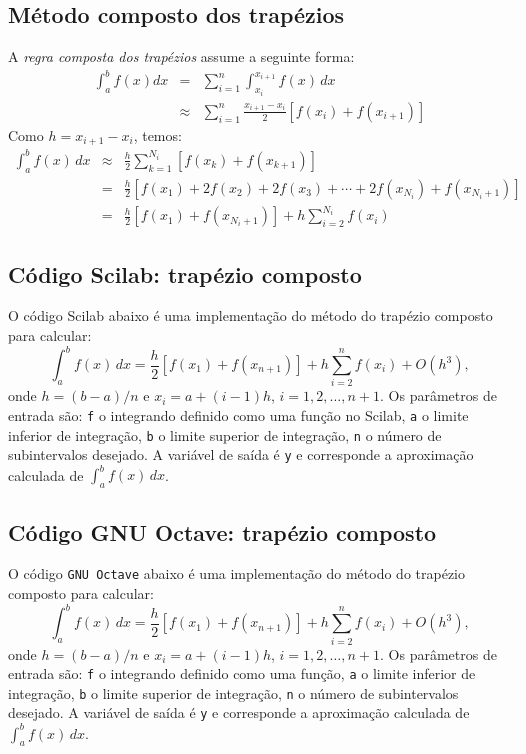 \subsection{Método composto dos trapézios}
A \emph{regra composta dos trapézios} assume a seguinte forma:
\begin{eqnarray*}
  \int_{a}^b f(x)dx &=& \sum_{i=1}^{n} \int_{x_i}^{x_{i+1}}f(x)\,dx \\
  &\approx& \sum_{i=1}^{n} \frac{x_{i+1}-x_i}{2}\left[f(x_i)+f(x_{i+1})\right]
\end{eqnarray*}
Como $h = x_{i+1} - x_i$, temos:
\begin{eqnarray*}
\int_{a}^b f(x)\,dx &\approx& \frac{h}{2}\sum_{k=1}^{N_i}\left[f(x_k)+f(x_{k+1})\right]\\
&=& \frac{h}{2}\left[f(x_1)+2f(x_2)+2f(x_3)+\cdots + 2f(x_{N_i})+f(x_{N_i+1})\right]\\
&=& \frac{h}{2}\left[f(x_1) + f(x_{N_i+1})\right] + h\sum_{i=2}^{N_i} f(x_i)
\end{eqnarray*}

\ifisscilab
\subsection{Código Scilab: trapézio composto}
O código Scilab abaixo é uma implementação do método do trapézio composto para calcular:
\begin{equation*}
  \int_a^b f(x)\,dx = \frac{h}{2}\left[f(x_1) + f(x_{n+1})\right] + h\sum_{i=2}^n f(x_i) + O(h^3),
\end{equation*}
onde $h = (b-a)/n$ e $x_i = a + (i-1)h$, $i=1,2,\dotsc,n+1$. Os parâmetros de entrada são: \verb+f+ o integrando definido como uma função no Scilab, \verb+a+ o limite inferior de integração, \verb+b+ o limite superior de integração, \verb+n+ o número de subintervalos desejado. A variável de saída é \verb+y+ e corresponde a aproximação calculada de $\int_a^b f(x)\, dx$.


\fi
\ifisoctave
\subsection{Código GNU Octave: trapézio composto}
O código \verb+GNU Octave+ abaixo é uma implementação do método do trapézio composto para calcular:
\begin{equation*}
  \int_a^b f(x)\,dx = \frac{h}{2}\left[f(x_1) + f(x_{n+1})\right] + h\sum_{i=2}^n f(x_i) + O(h^3),
\end{equation*}
onde $h = (b-a)/n$ e $x_i = a + (i-1)h$, $i=1,2,\dotsc,n+1$. Os parâmetros de entrada são: \verb+f+ o integrando definido como uma função, \verb+a+ o limite inferior de integração, \verb+b+ o limite superior de integração, \verb+n+ o número de subintervalos desejado. A variável de saída é \verb+y+ e corresponde a aproximação calculada de $\int_a^b f(x)\, dx$.

